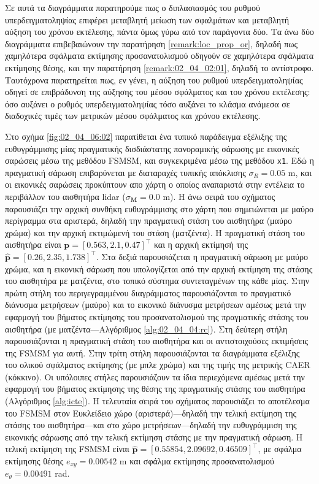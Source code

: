 Σε αυτά τα διαγράμματα παρατηρούμε πως ο διπλασιασμός του ρυθμού
υπερδειγματοληψίας επιφέρει μεταβλητή μείωση των σφαλμάτων και μεταβλητή αύξηση
του χρόνου εκτέλεσης, πάντα όμως γύρω από τον παράγοντα δύο. Τα άνω δύο
διαγράμματα επιβεβαιώνουν την παρατήρηση \ref{remark:loc_prop_or}, δηλαδή πως
χαμηλότερα σφάλματα εκτίμησης προσανατολισμού οδηγούν σε χαμηλότερα σφάλματα
εκτίμησης θέσης, και την παρατήρηση \ref{remark:02_04_02:01}, δηλαδή το
αντίστροφο. Ταυτόχρονα παρατηρείται πως, εν γένει, η αύξηση του ρυθμού
υπερδειγματοληψίας οδηγεί σε επιβράδυνση της αύξησης του μέσου σφάλματος και
του χρόνου εκτέλεσης: όσο αυξάνει ο ρυθμός υπερδειγματοληψίας τόσο  αυξάνει το
κλάσμα ανάμεσα σε διαδοχικές τιμές των μετρικών μέσου σφάλματος και χρόνου
εκτέλεσης.


Στο σχήμα \ref{fig:02_04_06:02} παρατίθεται ένα τυπικό παράδειγμα εξέλιξης της
ευθυγράμμισης μίας πραγματικής δισδιάστατης πανοραμικής σάρωσης με εικονικές
σαρώσεις μέσω της μεθόδου FSMSM, και συγκεκριμένα μέσω της μεθόδου \texttt{x1}.
Εδώ η πραγματική σάρωση επιβαρύνεται με διαταραχές τυπικής απόκλισης $\sigma_R
= 0.05$ m, και οι εικονικές σαρώσεις προκύπτουν απο χάρτη ο οποίος αναπαριστά
στην εντέλεια το περιβάλλον του αισθητήρα lidar ($\sigma_{\bm{M}} = 0.0$ m). Η
άνω σειρά του σχήματος παρουσιάζει την αρχική συνθήκη ευθυγράμμισης στο χάρτη
που σημειώνεται με μαύρο περίγραμμα στα αριστερά, δηλαδή την πραγματική στάση
του αισθητήρα (μαύρο χρώμα) και την αρχική εκτιμώμενή του στάση (ματζέντα). Η
πραγματική στάση του αισθητήρα είναι $\bm{p} = [0.563, 2.1, 0.47]^\top$ και η
αρχική εκτίμησή της $\hat{\bm{p}} = [0.26, 2.35, 1.738]^\top$. Στα δεξιά
παρουσιάζεται η πραγματική σάρωση με μαύρο χρώμα, και η εικονική σάρωση που
υπολογίζεται από την αρχική εκτίμηση της στάσης του αισθητήρα με ματζέντα, στο
τοπικό σύστημα συντεταγμένων της κάθε μίας. Στην πρώτη στήλη του
περιγεγραμμένου διαγράμματος παρουσιάζονται το πραγματικό διάνυσμα μετρήσεων
(μαύρο) και το εικονικό διάνυσμα μετρήσεων αμέσως μετά την εφαρμογή του βήματος
εκτίμησης του προσανατολισμού της πραγματικής στάσης του αισθητήρα (με
ματζέντα---Αλγόριθμος \ref{alg:02_04_04:rc}). Στη δεύτερη στήλη παρουσιάζονται
η πραγματική στάση του αισθητήρα και οι αντιστοιχούσες εκτιμήσεις της FSMSM για
αυτή. Στην τρίτη στήλη παρουσιάζονται τα διαγράμματα εξέλιξης του ολικού
σφάλματος εκτίμησης (με μπλε χρώμα) και της τιμής της μετρικής CAER (κόκκινο).
Οι υπόλοιπες στήλες παρουσιάζουν τα ίδια περιεχόμενα αμέσως μετά την εφαρμογή
του βήματος εκτίμησης της θέσης της πραγματικής στάσης του αισθητήρα
(Αλγόριθμος \ref{alg:icte}).  Η τελευταία σειρά του σχήματος παρουσιάζει το
αποτέλεσμα του FSMSM στον Ευκλείδειο χώρο (αριστερά)---δηλαδή την τελική
εκτίμηση της στάσης του αισθητήρα---και στο χώρο μετρήσεων---δηλαδή την
ευθυγράμμιση της εικονικής σάρωσης από την τελική εκτίμηση στάσης με την
πραγματική σάρωση. Η τελική εκτίμηση της FSMSM είναι $\hat{\bm{p}} = [0.55854,
2.09692, 0.46509]^\top$, με σφάλμα εκτίμησης θέσης $e_{xy} = 0.00542$ m και
σφάλμα εκτίμησης προσανατολισμού $e_{\theta} = 0.00491$ rad.

